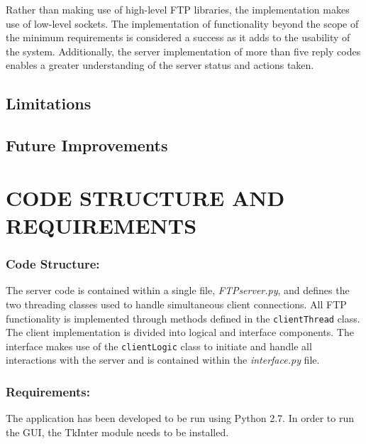 \documentclass[10pt,twocolumn]{witseiepaper}
\begin{document}
Rather than making use of high-level FTP libraries, the implementation makes use of low-level sockets. The implementation of functionality beyond the scope of the minimum requirements is considered a success as it adds to the usability of the system. Additionally, the server implementation of more than five reply codes enables a greater understanding of the server status and actions taken.


\subsection{Limitations}


\subsection{Future Improvements}


\section{CODE STRUCTURE AND REQUIREMENTS}

\subsubsection*{Code Structure: } The server code is contained within a single file, \textit{FTPserver.py}, and defines the two threading classes used to handle simultaneous client connections. All FTP functionality is implemented through methods defined in the \texttt{clientThread} class. The client implementation is divided into logical and interface components. The interface makes use of the \texttt{clientLogic} class to initiate and handle all interactions with the server and is contained within the \textit{interface.py} file.  %
 


\subsubsection*{Requirements: }
The application has been developed to be run using Python 2.7. In order to run the GUI, the TkInter module needs to be installed.
\end{document}
